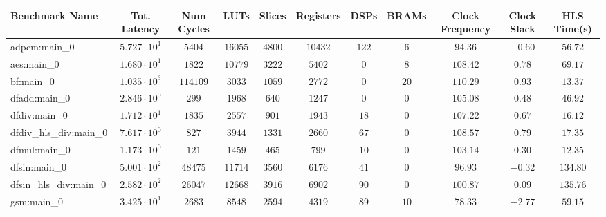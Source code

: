 \begin{tabular}{|l|c|c|c|c|c|c|c|c|c|c|}
\hline
Benchmark Name          & Tot. Latency           & Num Cycles & LUTs       & Slices    & Registers & DSPs    & BRAMs   & Clock Frequency & Clock Slack & HLS Time(s) \\
\hline
adpcm:main\_0           & $ 5.727 \cdot 10^{1} $ & $ 5404   $ & $ 16055  $ & $ 4800  $ & $ 10432 $ & $ 122 $ & $ 6   $ & $ 94.36       $ & $ -0.60   $ & $ 56.72   $ \\
aes:main\_0             & $ 1.680 \cdot 10^{1} $ & $ 1822   $ & $ 10779  $ & $ 3222  $ & $ 5402  $ & $ 0   $ & $ 8   $ & $ 108.42      $ & $ 0.78    $ & $ 69.17   $ \\
bf:main\_0              & $ 1.035 \cdot 10^{3} $ & $ 114109 $ & $ 3033   $ & $ 1059  $ & $ 2772  $ & $ 0   $ & $ 20  $ & $ 110.29      $ & $ 0.93    $ & $ 13.37   $ \\
dfadd:main\_0           & $ 2.846 \cdot 10^{0} $ & $ 299    $ & $ 1968   $ & $ 640   $ & $ 1247  $ & $ 0   $ & $ 0   $ & $ 105.08      $ & $ 0.48    $ & $ 46.92   $ \\
dfdiv:main\_0           & $ 1.712 \cdot 10^{1} $ & $ 1835   $ & $ 2557   $ & $ 901   $ & $ 1943  $ & $ 18  $ & $ 0   $ & $ 107.22      $ & $ 0.67    $ & $ 16.12   $ \\
dfdiv\_hls\_div:main\_0 & $ 7.617 \cdot 10^{0} $ & $ 827    $ & $ 3944   $ & $ 1331  $ & $ 2660  $ & $ 67  $ & $ 0   $ & $ 108.57      $ & $ 0.79    $ & $ 17.35   $ \\
dfmul:main\_0           & $ 1.173 \cdot 10^{0} $ & $ 121    $ & $ 1459   $ & $ 465   $ & $ 799   $ & $ 10  $ & $ 0   $ & $ 103.14      $ & $ 0.30    $ & $ 12.35   $ \\
dfsin:main\_0           & $ 5.001 \cdot 10^{2} $ & $ 48475  $ & $ 11714  $ & $ 3560  $ & $ 6176  $ & $ 41  $ & $ 0   $ & $ 96.93       $ & $ -0.32   $ & $ 134.80  $ \\
dfsin\_hls\_div:main\_0 & $ 2.582 \cdot 10^{2} $ & $ 26047  $ & $ 12668  $ & $ 3916  $ & $ 6902  $ & $ 90  $ & $ 0   $ & $ 100.87      $ & $ 0.09    $ & $ 135.76  $ \\
gsm:main\_0             & $ 3.425 \cdot 10^{1} $ & $ 2683   $ & $ 8548   $ & $ 2594  $ & $ 4319  $ & $ 89  $ & $ 10  $ & $ 78.33       $ & $ -2.77   $ & $ 59.15   $ \\

\end{tabular}

